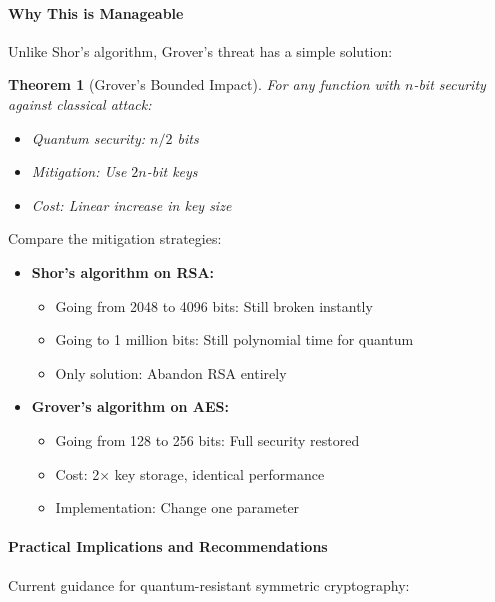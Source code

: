 \documentclass[11pt,a4paper]{article}
\newtheorem{theorem}{Theorem}
\begin{document}
\paragraph{Why This is Manageable}

Unlike Shor's algorithm, Grover's threat has a simple solution:

\begin{theorem}[Grover's Bounded Impact]
For any function with $n$-bit security against classical attack:
\begin{itemize}
    \item Quantum security: $n/2$ bits
    \item Mitigation: Use $2n$-bit keys
    \item Cost: Linear increase in key size
\end{itemize}
\end{theorem}

Compare the mitigation strategies:

\begin{itemize}
    \item \textbf{Shor's algorithm on RSA:}
    \begin{itemize}
        \item Going from 2048 to 4096 bits: Still broken instantly
        \item Going to 1 million bits: Still polynomial time for quantum
        \item Only solution: Abandon RSA entirely
    \end{itemize}
    \item \textbf{Grover's algorithm on AES:}
    \begin{itemize}
        \item Going from 128 to 256 bits: Full security restored
        \item Cost: 2× key storage, identical performance
        \item Implementation: Change one parameter
    \end{itemize}
\end{itemize}

\paragraph{Practical Implications and Recommendations}

Current guidance for quantum-resistant symmetric cryptography:
\end{document}
